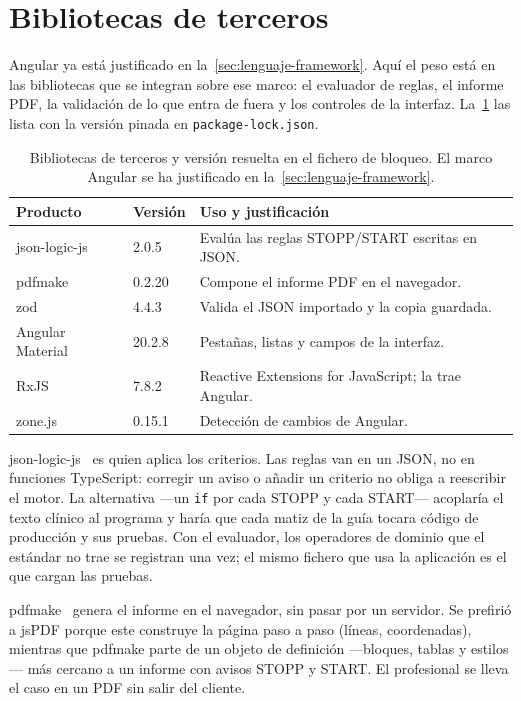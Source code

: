 \section{Bibliotecas de terceros}
\label{sec:bibliotecas}

Angular ya está justificado en la~\cref{sec:lenguaje-framework}. Aquí
el peso está en las bibliotecas que se integran sobre ese marco: el
evaluador de reglas, el informe PDF, la validación de lo que entra de
fuera y los controles de la interfaz. La~\cref{tab:terceros} las lista
con la versión pinada en \texttt{package-lock.json}.

\begin{table}[H]
  \centering
  \scriptsize
  \begin{tabularx}{\textwidth}{@{}llX@{}}
    \toprule
    \textbf{Producto} & \textbf{Versión} & \textbf{Uso y justificación} \\
    \midrule
    json-logic-js      & 2.0.5  & Evalúa las reglas STOPP/START escritas en JSON. \\
    pdfmake            & 0.2.20 & Compone el informe PDF en el navegador. \\
    zod                & 4.4.3  & Valida el JSON importado y la copia guardada. \\
    Angular Material   & 20.2.8 & Pestañas, listas y campos de la interfaz. \\
    RxJS               & 7.8.2  & Reactive Extensions for JavaScript; la trae Angular. \\
    zone.js            & 0.15.1 & Detección de cambios de Angular. \\
    \bottomrule
  \end{tabularx}
  \caption{Bibliotecas de terceros y versión resuelta en el fichero de bloqueo.
  El marco Angular se ha justificado en la~\cref{sec:lenguaje-framework}.}
  \label{tab:terceros}
\end{table}

json-logic-js~\cite{jsonlogic} es quien aplica los criterios. Las reglas
van en un JSON, no en funciones TypeScript: corregir un aviso o añadir
un criterio no obliga a reescribir el motor. La alternativa ---un
\texttt{if} por cada STOPP y cada START--- acoplaría el texto clínico
al programa y haría que cada matiz de la guía tocara código de
producción y sus pruebas. Con el evaluador, los operadores de dominio
que el estándar no trae se registran una vez; el mismo fichero que usa
la aplicación es el que cargan las pruebas.

pdfmake~\cite{pdfmake} genera el informe en el navegador, sin pasar por
un servidor. Se prefirió a jsPDF porque este construye la página paso a
paso (líneas, coordenadas), mientras que pdfmake parte de un objeto de
definición ---bloques, tablas y estilos--- más cercano a un informe con
avisos STOPP y START. El profesional se lleva el caso en un PDF sin
salir del cliente.

